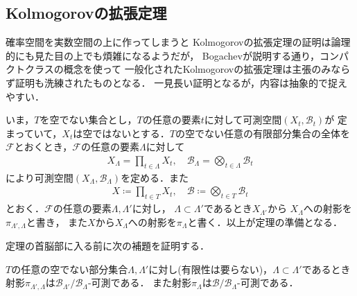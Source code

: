 \subsection{Kolmogorovの拡張定理}
	確率空間を実数空間の上に作ってしまうと
	Kolmogorovの拡張定理の証明は論理的にも見た目の上でも煩雑になるようだが，
	Bogachevが説明する通り，コンパクトクラスの概念を使って
	一般化されたKolmogorovの拡張定理は主張のみならず証明も洗練されたものとなる．
	一見長い証明となるが，内容は抽象的で捉えやすい．
	
	いま，$T$を空でない集合とし，$T$の任意の要素$t$に対して可測空間$(X_t,\mathscr{B}_t)$が
	定まっていて，$X_t$は空ではないとする．$T$の空でない任意の有限部分集合の全体を
	$\mathscr{F}$とおくとき，$\mathscr{F}$の任意の要素$\Lambda$に対して
	\begin{align}
		X_\Lambda = \prod_{t \in \Lambda} X_t,
		\quad \mathscr{B}_\Lambda = \bigotimes_{t \in \Lambda} \mathscr{B}_t
	\end{align}
	により可測空間$(X_\Lambda,\mathscr{B}_\Lambda)$を定める．また
	\begin{align}
		X \coloneqq \prod_{t \in T} X_t,
		\quad \mathscr{B} \coloneqq \bigotimes_{t \in T} \mathscr{B}_t
	\end{align}
	とおく．$\mathscr{F}$の任意の要素$\Lambda,\Lambda'$に対し，
	$\Lambda \subset \Lambda'$であるとき$X_{\Lambda'}$から
	$X_{\Lambda}$への射影を$\pi_{\Lambda',\Lambda}$と書き，
	また$X$から$X_\Lambda$への射影を$\pi_{\Lambda}$と書く．以上が定理の準備となる．
	
	定理の首脳部に入る前に次の補題を証明する．
	\begin{screen}
		\begin{lem}[射影の可測性]\label{lem:Kolmogorov_extension_theorem}
			$T$の任意の空でない部分集合$\Lambda,\Lambda'$に対し(有限性は要らない)，$\Lambda \subset \Lambda'$であるとき
			射影$\pi_{\Lambda',\Lambda}$は$\mathscr{B}_{\Lambda'}/\mathscr{B}_\Lambda$-可測である．
			また射影$\pi_\Lambda$は$\mathscr{B}/\mathscr{B}_\Lambda$-可測である．
		\end{lem}
	\end{screen}
	
